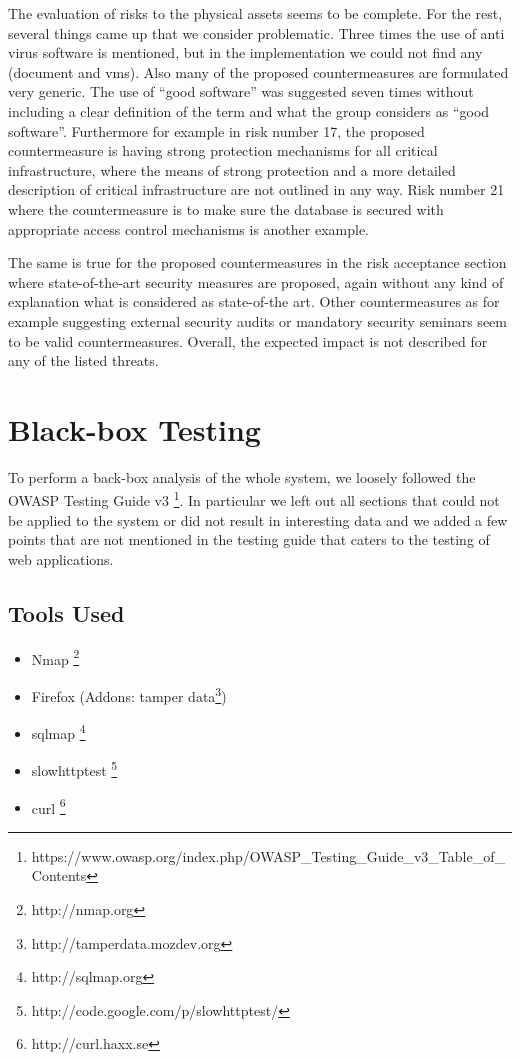 \documentclass{article}
\begin{document}
The evaluation of risks to the physical assets seems to be complete. For the rest, several things came up that we consider problematic. Three times the use of anti virus software is mentioned, but in the implementation we could not find any (document and vms). Also many of the proposed countermeasures are formulated very generic. The use of ``good software'' was suggested seven times without including a clear definition of the term and what the group considers as ``good software''.\newline
Furthermore for example in risk number 17, the proposed countermeasure is having strong protection mechanisms for all critical infrastructure, where the means of strong protection and a more detailed description of critical infrastructure are not outlined in any way. Risk number 21 where the countermeasure is to make sure the database is secured with appropriate access control mechanisms is another example.

The same is true for the proposed countermeasures in the risk acceptance section where state-of-the-art security measures are proposed, again without any kind of explanation what is considered as state-of-the art. Other countermeasures as for example suggesting external security audits or mandatory security seminars seem to be valid countermeasures. Overall, the expected impact is not described for any of the listed threats.

\section{Black-box Testing}
To perform a back-box analysis of the whole system, we loosely followed the OWASP Testing Guide v3 \footnote{https://www.owasp.org/index.php/OWASP\_Testing\_Guide\_v3\_Table\_of\_Contents}. In particular we left out all sections that could not be applied to the system or did not result in interesting data and we added a few points that are not mentioned in the testing guide that caters to the testing of web applications.

\subsection{Tools Used}
\begin{itemize}
\item Nmap \footnote{http://nmap.org}
\item Firefox (Addons: tamper data\footnote{http://tamperdata.mozdev.org})
\item sqlmap \footnote{http://sqlmap.org}
\item slowhttptest \footnote{http://code.google.com/p/slowhttptest/}
\item curl \footnote{http://curl.haxx.se}
\end{itemize}
\end{document}
